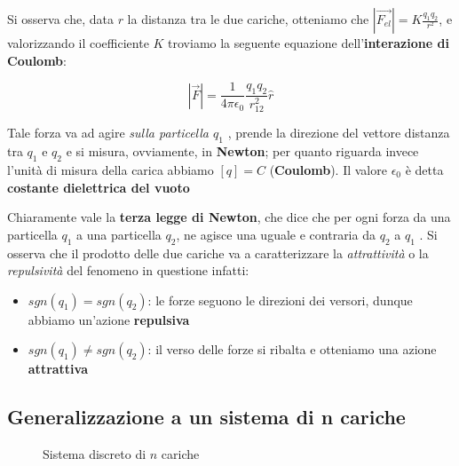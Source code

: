 Si osserva che, data $r$ la distanza tra le due cariche, otteniamo che $|\vec{F_{el}}| = K\frac{q_1q_2}{r^2}$, e valorizzando il coefficiente $K$ troviamo la seguente equazione dell'\textbf{interazione di Coulomb}: 

\begin{large}
\begin{equation}
	|\vec{F}| = \frac{1}{4\pi\epsilon_0} \frac{q_1q_2}{r_{12}^2} \hat{r}
	\label{f_coulomb}
\end{equation}
\end{large}


Tale forza va ad agire \textit{sulla particella $q_1$} , prende la direzione del vettore distanza tra $q_1$ e $q_2$ e si misura, ovviamente, in \textbf{Newton}; per quanto riguarda invece l'unità di misura della carica abbiamo $[q] = C$ (\textbf{Coulomb}). Il valore $\epsilon_0$ è detta \textbf{costante dielettrica del vuoto}

Chiaramente vale la \textbf{terza legge di Newton}, che dice che per ogni forza da una particella $q_1$ a una particella $q_2$, ne agisce una uguale e contraria da $q_2$ a $q_1$ . Si osserva che il prodotto delle due cariche va a caratterizzare la \textit{attrattività} o la \textit{repulsività} del fenomeno in questione infatti: 

\begin{itemize}
	\item $sgn(q_1) = sgn(q_2)$: le forze seguono le direzioni dei versori, dunque abbiamo un'azione \textbf{repulsiva}
	\item $sgn(q_1)  \neq sgn(q_2)$: il verso delle forze si ribalta e otteniamo una azione \textbf{attrattiva}
\end{itemize}

\subsection{Generalizzazione a un sistema di n cariche}

\begin{figure} [ht]
	\centering
	\caption{Sistema discreto di $n$ cariche}
	\label{sistema_n_cariche}
\end{figure}

